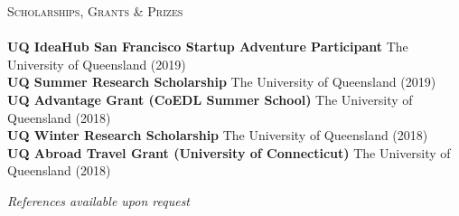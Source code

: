 \documentclass[a4paper]{article}
\newcommand{\lineunder} {
    \vspace*{-8pt} \\
    \hspace*{-10pt} \hrulefill \\
}
\newcommand{\header} [1] {
    {\hspace*{-10pt}\vspace*{6pt} \textsc{#1}}
    \vspace*{-6pt} \lineunder
}
\begin{document}
\vspace{1mm}

\header{Scholarships, Grants \& Prizes}
\textbf{UQ IdeaHub San Francisco Startup Adventure Participant} \hfill The University of Queensland (2019)\\
\textbf{UQ Summer Research Scholarship} \hfill The University of Queensland (2019)\\
\textbf{UQ Advantage Grant (CoEDL Summer School)} \hfill The University of Queensland (2018)\\
\textbf{UQ Winter Research Scholarship} \hfill The University of Queensland (2018)\\
\textbf{UQ Abroad Travel Grant (University of Connecticut)} \hfill The University of Queensland (2018)\\


\vspace{5mm}
\begin{center}
\small \textit{References available upon request}
\end{center}
\end{document}
